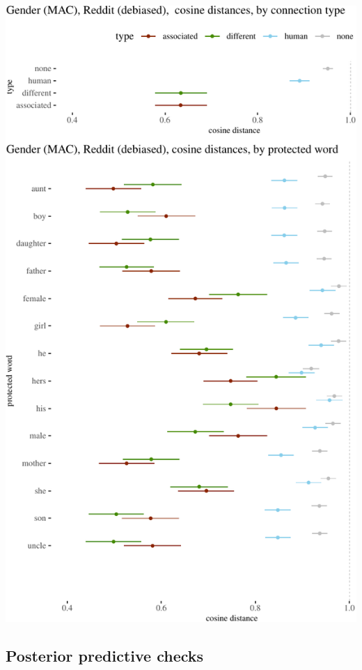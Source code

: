 \documentclass{clv3}
\begin{document}
\begin{center}\includegraphics[width=1\linewidth]{figures/resultsDebiasedGenderReddita} \end{center}

\hypertarget{posterior-predictive-checks}{%
\subsection{Posterior predictive
checks}\label{posterior-predictive-checks}}
\end{document}
